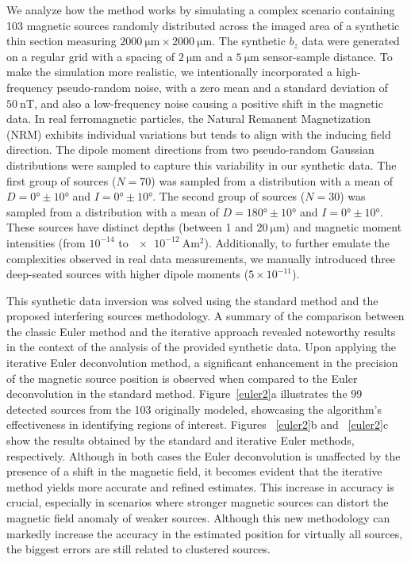 We analyze how the method works by simulating a complex scenario containing 103 magnetic sources randomly distributed across the imaged area of a synthetic thin section measuring $\qty{2000}{\um} \times \qty{2000}{\um}$. The synthetic $b_z$ data were generated on a regular grid with a spacing of $\qty{2}{\um}$ and a $\qty{5}{\um}$ sensor-sample distance. To make the simulation more realistic, we intentionally incorporated a high-frequency pseudo-random noise, with a zero mean and a standard deviation of $\qty{50}{\nano\tesla}$, and also a low-frequency noise causing a positive shift in the magnetic data. In real ferromagnetic particles, the Natural Remanent Magnetization (NRM) exhibits individual variations but tends to align with the inducing field direction. The dipole moment directions from two pseudo-random Gaussian distributions were sampled to capture this variability in our synthetic data. The first group of sources ($N = 70$) was sampled from a distribution with a mean of $D = \ang{0}\pm\ang{10}$ and $I = \ang{0}\pm\ang{10}$. The second group of sources ($N = 30$) was sampled from a distribution with a mean of $D = \ang{180}\pm\ang{10}$ and $I = \ang{0}\pm\ang{10}$. These sources have distinct depths (between 1 and $\qty{20}{\um}$) and magnetic moment intensities (from $10^{-14}$ to $\qty{e-12}{\ampere\m\squared}$). Additionally, to further emulate the complexities observed in real data measurements, we manually introduced three deep-seated sources with higher dipole moments ($5 \times 10^{-11}$). 

This synthetic data inversion was solved using the standard method \citep{Souza-Junior2023b} and the proposed interfering sources methodology. A summary of the comparison between the classic Euler method and the iterative approach revealed noteworthy results in the context of the analysis of the provided synthetic data. Upon applying the iterative Euler deconvolution method, a significant enhancement in the precision of the magnetic source position is observed when compared to the Euler deconvolution in the standard method. Figure~\ref{euler2}a illustrates the 99 detected sources from the 103 originally modeled, showcasing the algorithm's effectiveness in identifying regions of interest. Figures ~\ref{euler2}b and ~\ref{euler2}c show the results obtained by the standard and iterative Euler methods, respectively. Although in both cases the Euler deconvolution is unaffected by the presence of a shift in the magnetic field, it becomes evident that the iterative method yields more accurate and refined estimates. This increase in accuracy is crucial, especially in scenarios where stronger magnetic sources can distort the magnetic field anomaly of weaker sources. Although this new methodology can markedly increase the accuracy in the estimated position for virtually all sources, the biggest errors are still related to clustered sources.


